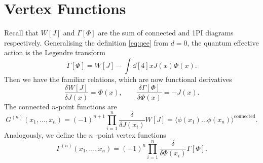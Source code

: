 
\section{Vertex Functions}%
\label{sec:vertex_functions}

Recall that $W[J]$ and $\Gamma[\Phi]$ are the sum of connected and 1PI diagrams respectively.
Generalising the definition \eqref{eq:qee} from $d =0$, the quantum effective action is the Legendre transform
\begin{equation}
  \Gamma[\Phi] = W[J] - \int \dd[4]{x} J(x) \Phi(x).
\end{equation}
Then we have the familiar relations, which are now functional derivatives
\begin{equation}
  \frac{\delta W[J]}{\delta J(x)} = \Phi(x),\qquad \frac{\delta \Gamma[\Phi]}{\delta \Phi(x)} = - J(x).
\end{equation}
The connected $n$-point functions are
\begin{equation}
  G^{(n)} (x_1, \dots, x_n) = (-1)^{n+1} \prod_{i = 1}^n \frac{\delta }{\delta J(x_{i})} W[J] = \langle \phi(x_1) \dots \phi(x_n) \rangle^{\text{connected}}.
\end{equation}
Analogously, we define the $n$ -point vertex functions
\begin{equation}
  \Gamma^{(n)} (x_1, \dots, x_n) = (-1)^{n} \prod_{i = 1}^n \frac{\delta }{\delta \Phi(x_i)} \Gamma[\Phi].
\end{equation}

